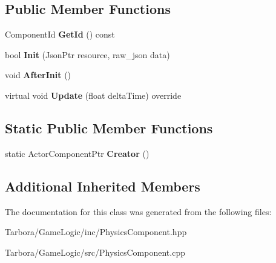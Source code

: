\subsection*{Public Member Functions}
\begin{DoxyCompactItemize}
\item 
\mbox{\label{classTarbora_1_1PhysicsComponent_a6f091a08748045941ac8b7f64c7bf787}} 
Component\+Id {\bfseries Get\+Id} () const
\item 
\mbox{\label{classTarbora_1_1PhysicsComponent_aa3449fb88e5737316433a6c04565dcf3}} 
bool {\bfseries Init} (Json\+Ptr resource, raw\+\_\+json data)
\item 
\mbox{\label{classTarbora_1_1PhysicsComponent_ab6d6e87ef073850de24193ed144e9588}} 
void {\bfseries After\+Init} ()
\item 
\mbox{\label{classTarbora_1_1PhysicsComponent_a103b68beca09b42ccc6b01cff6e153bc}} 
virtual void {\bfseries Update} (float delta\+Time) override
\end{DoxyCompactItemize}
\subsection*{Static Public Member Functions}
\begin{DoxyCompactItemize}
\item 
\mbox{\label{classTarbora_1_1PhysicsComponent_a7b8571964b570d2c41e81320abf86653}} 
static Actor\+Component\+Ptr {\bfseries Creator} ()
\end{DoxyCompactItemize}
\subsection*{Additional Inherited Members}


The documentation for this class was generated from the following files\+:\begin{DoxyCompactItemize}
\item 
Tarbora/\+Game\+Logic/inc/Physics\+Component.\+hpp\item 
Tarbora/\+Game\+Logic/src/Physics\+Component.\+cpp\end{DoxyCompactItemize}
